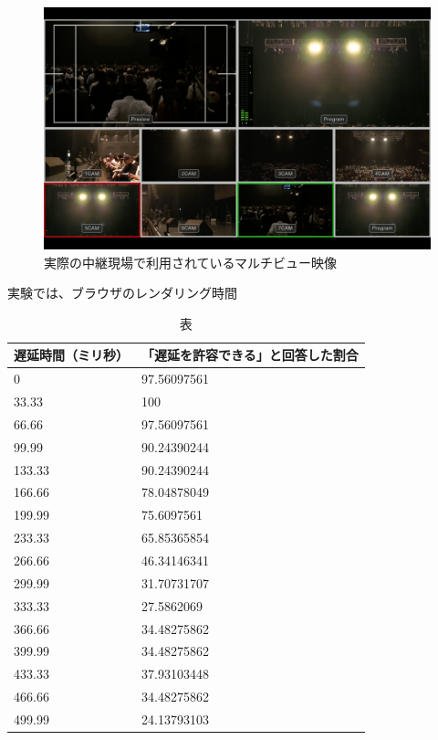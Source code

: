 \begin{figure}[htbp]
  \begin{center}
    \includegraphics[bb=0 0 1680 1050,width=14cm]{img/mv-delay-actual.png}
  \end{center}
  \caption{実際の中継現場で利用されているマルチビュー映像}
  \label{fig:mv-delay-actual}
\end{figure}

実験では、ブラウザのレンダリング時間

\begin{table}[htbp]
  \caption{表}
  \label{tb:fpga-implement-modules}
  \begin{center}
  \begin{tabular}{l|l}
    \hline
    遅延時間（ミリ秒） & 「遅延を許容できる」と回答した割合 \\\hline\hline
    0               & 97.56097561 \\\hline
    33.33           & 100         \\\hline
    66.66           & 97.56097561 \\\hline
    99.99           & 90.24390244 \\\hline
    133.33          & 90.24390244 \\\hline
    166.66          & 78.04878049 \\\hline
    199.99          & 75.6097561  \\\hline
    233.33          & 65.85365854 \\\hline
    266.66          & 46.34146341 \\\hline
    299.99          & 31.70731707 \\\hline
    333.33          & 27.5862069  \\\hline
    366.66          & 34.48275862 \\\hline
    399.99          & 34.48275862 \\\hline
    433.33          & 37.93103448 \\\hline
    466.66          & 34.48275862 \\\hline
    499.99          & 24.13793103 \\\hline
  \end{tabular}\end{center}
\end{table}


